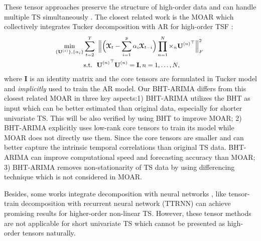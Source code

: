 \documentclass[letterpaper]{article} %
\numberwithin{theorem}{section}
\newcommand{\ten}[1]{ \boldsymbol{\mathcal #1}}
\begin{document}
These tensor  approaches preserve the structure of high-order data and can handle multiple TS simultaneously \cite{rogers2013multilinear,fanaee2016tensor,de2017tensorcast,bhanu2018forecasting,agarwal2018model}. The closest  related work is the  MOAR which collectively integrates    Tucker decomposition  with AR   for high-order TSF \cite{jing2018high}:
\begin{equation}\label{MOAR}
\small
\begin{aligned}
\hspace{-0.1cm} \mathop{\min}_{ \{{\mathbf U}^{(i)}\}, \{\alpha_i \}  } &  \sum_{t=2}^{{T}}\ \Big \| \Big(  {{\ten{X}}_t}  -  \sum_{i=1}^{p} \alpha_i  {{\ten{X}}_{t-i}}  \Big) \prod_{n=1}^N \times_n { \mathbf U}{^{(n)}}^\top   \Big {\|} _F^2   \\&  \text{s.t.}  \ \ { \mathbf U}{^{(n)}}^\top { \mathbf U}{^{(n)}} = \mathbf I, n=1,\ldots, N,
\end{aligned}
\end{equation}
where   $\mathbf I$ is an identity matrix and  the core tensors  are formulated in Tucker model and   \textit{implicitly}  used  to train the  AR model.  Our BHT-ARIMA  differs  from this closest related MOAR in three key aspects:1) BHT-ARIMA utilizes the BHT as input which can be better estimated than original data, especially for shorter univariate TS.   This will be also  verified by using BHT to improve MOAR;
2) BHT-ARIMA explicitly  uses low-rank core tensors to train its model while  MOAR does not directly use them. Since the core tensors are  smaller and can  better capture the intrinsic temporal correlations than  original TS data. BHT-ARIMA can improve computational speed  and   forecasting accuracy than MOAR;
3)  BHT-ARIMA removes non-stationarity  of TS data by using  differencing technique  which is not considered in MOAR.

Besides, some works  integrate  decomposition with neural networks \cite{chen2018neucast,ma2019large,sun2019bayesian}, like tensor-train decomposition  with recurrent neural network (TTRNN) \cite{yu2017long}   can  achieve promising results for higher-order non-linear TS.   However, these tensor methods are not applicable for  short  univariate TS which cannot be presented as high-order tensors naturally.
\end{document}
